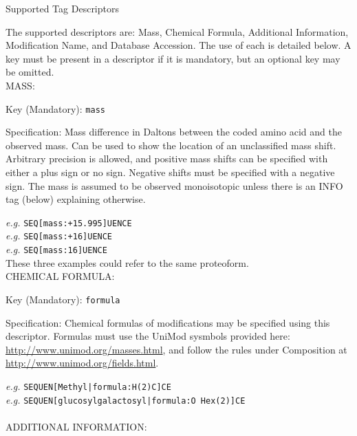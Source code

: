 
\begin{newrule}
Supported Tag Descriptors
\end{newrule}

The supported descriptors are: Mass, Chemical Formula, Additional Information, Modification Name, and Database Accession. The use of each is detailed below. A key must be present in a descriptor if it is mandatory, but an optional key may be omitted.
\\

\noindent \large{MASS:}

Key (Mandatory): \texttt{mass}

Specification: Mass difference in Daltons between the coded amino acid and the observed mass. Can be used to show the location of an unclassified mass shift. Arbitrary precision is allowed, and positive mass shifts can be specified with either a plus sign or no sign. Negative shifts must be specified with a negative sign. The mass is assumed to be observed monoisotopic unless there is an INFO tag (below) explaining otherwise.

\indent \textit{e.g.} \texttt{SEQ[mass:+15.995]UENCE} \\
\indent \textit{e.g.} \texttt{SEQ[mass:+16]UENCE} \\
\indent \textit{e.g.} \texttt{SEQ[mass:16]UENCE} \\
\indent \indent These three examples could refer to the same proteoform.
\\

\noindent \large{CHEMICAL FORMULA:}

Key (Mandatory): \texttt{formula}

Specification: Chemical formulas of modifications may be specified using this descriptor. Formulas must use the UniMod sysmbols provided here: \url{http://www.unimod.org/masses.html}, and follow the rules under Composition at \url{http://www.unimod.org/fields.html}.

\indent \textit{e.g.} \texttt{SEQUEN[Methyl|formula:H(2)C]CE} \\
\indent \textit{e.g.} \texttt{SEQUEN[glucosylgalactosyl|formula:O Hex(2)]CE} \\
\\

\noindent \large{ADDITIONAL INFORMATION:}

